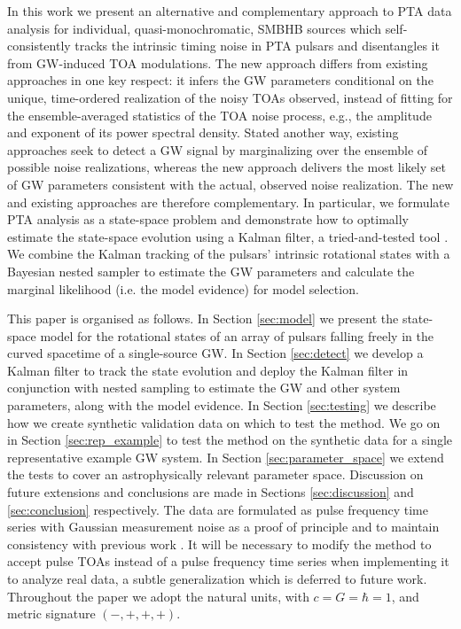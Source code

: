 \documentclass[fleqn,usenatbib,useAMS]{mnras}
\begin{document}
In this work we present an alternative and complementary approach to PTA data analysis for individual, quasi-monochromatic, SMBHB sources which self-consistently tracks the intrinsic timing noise in PTA pulsars and disentangles it from GW-induced TOA modulations. The new approach differs from existing approaches in one key respect: it infers the GW parameters conditional on the unique, time-ordered realization of the noisy TOAs observed, instead of fitting for the ensemble-averaged statistics of the TOA noise process, e.g., the amplitude and exponent of its power spectral density. Stated another way, existing approaches seek to detect a GW signal by marginalizing over the ensemble of possible noise realizations, whereas the new approach delivers the most likely set of GW parameters consistent with the actual, observed noise realization. The new and existing approaches are therefore complementary. In particular, we formulate PTA analysis as a state-space problem and demonstrate how to optimally estimate the state-space evolution using a Kalman filter, a tried-and-tested tool \citep{Kalman1,Meyers2021,Melatos2023}. We combine the Kalman tracking of the pulsars' intrinsic rotational states with a Bayesian nested sampler \citep{Skilling, Ashton2022} to estimate the GW parameters and calculate the marginal likelihood (i.e. the model evidence) for model selection. \newline 

\noindent This paper is organised as follows. In Section \ref{sec:model} we present the state-space model for the rotational states of an array of pulsars falling freely in the curved spacetime of a single-source GW. In Section \ref{sec:detect} we develop a Kalman filter to track the state evolution and deploy the Kalman filter in conjunction with nested sampling to estimate the GW and other system parameters, along with the model evidence. In Section \ref{sec:testing} we describe how we create synthetic validation data on which to test the method. We go on in Section \ref{sec:rep_example} to test the method on the synthetic data for a single representative example GW system. In Section \ref{sec:parameter_space} we extend the tests to cover an astrophysically relevant parameter space. Discussion on future extensions and conclusions are made in Sections \ref{sec:discussion} and \ref{sec:conclusion} respectively. The data are formulated as pulse frequency time series with Gaussian measurement noise as a proof of principle and to maintain consistency with previous work \citep{Myers2021MNRAS.502.3113M,Meyers2021}. It will be necessary to modify the method to accept pulse TOAs instead of a pulse frequency time series when implementing it to analyze real data, a subtle generalization which is deferred to future work. Throughout the paper we adopt the natural units, with $c = G = \hbar = 1$, and metric signature $(-,+,+,+)$. \newline 
\end{document}
